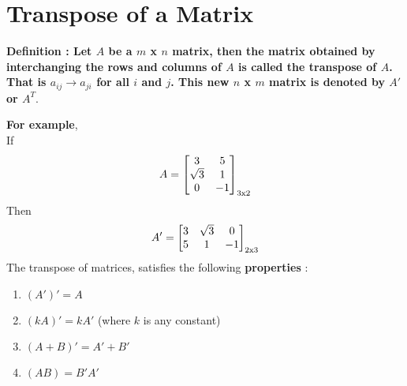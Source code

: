 \documentclass[12pt, letterpaper]{article}
\begin{document}
\section{Transpose of a Matrix}
\begin{displayquote}
\textbf{Definition : Let $A$ be a $m$ x $n$ matrix, then the matrix obtained by interchanging the rows and columns of $A$ is called the transpose of $A$. That is $a_{ij} \rightarrow a_{ji}$ for all $i$ and $j$. This new $n$ x $m$ matrix is denoted by $A'$ or $A^T$}.
\end{displayquote}
\textbf{For example}, \\
If 
\begin{displaymath}
A = \begin{bmatrix}
3 & 5\\
\sqrt{3} & 1\\
0 & -1
\end{bmatrix}_{3 \textnormal{x} 2}
\end{displaymath}
Then
\begin{displaymath}
A' = \begin{bmatrix}
3 & \sqrt{3} & 0\\
5 & 1 & -1
\end{bmatrix}_{2 \textnormal{x} 3}
\end{displaymath}
The transpose of matrices, satisfies the following \textbf{properties} :
\begin{enumerate}
    \item $(A')' = A$
    \item $(kA)' = kA'$ (where $k$ is any constant)
    \item $(A + B)' = A' + B'$
    \item $(AB) = B'A'$
\end{enumerate}
\end{document}
